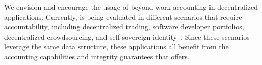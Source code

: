 We envision and encourage the usage of \TrustChain{} beyond work accounting in decentralized applications.
Currently, \TrustChain{} is being evaluated in different scenarios that require accountability, including decentralized trading, software developer portfolios, decentralized crowdsourcing, and self-sovereign identity~\cite{de2021xchange,de2019devid,stokkink2018deployment}.
Since these scenarios leverage the same data structure, these applications all benefit from the accounting capabilities and integrity guarantees that \TrustChain{} offers.